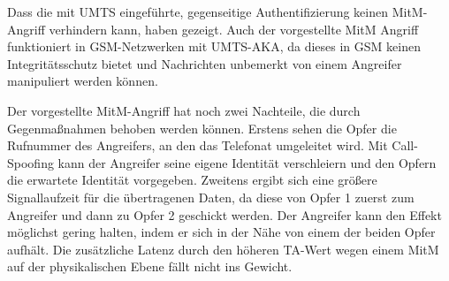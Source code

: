 Dass die mit \ac{UMTS} eingeführte, gegenseitige Authentifizierung keinen \ac{MitM}-Angriff verhindern kann, haben \citet{meyer2004man} gezeigt. Auch der vorgestellte \ac{MitM} Angriff funktioniert in \ac{GSM}-Netzwerken mit \ac{UMTS}-\ac{AKA}, da dieses in \ac{GSM} keinen Integritätsschutz bietet und Nachrichten unbemerkt von einem Angreifer manipuliert werden können.

Der vorgestellte \ac{MitM}-Angriff hat noch zwei Nachteile, die durch Gegenmaßnahmen behoben werden können. Erstens sehen die Opfer die Rufnummer des Angreifers, an den das Telefonat umgeleitet wird. Mit Call-Spoofing kann der Angreifer seine eigene Identität verschleiern und den Opfern die erwartete Identität vorgegeben. Zweitens ergibt sich eine größere Signallaufzeit für die übertragenen Daten, da diese von Opfer 1 zuerst zum Angreifer und dann zu Opfer 2 geschickt werden. Der Angreifer kann den Effekt möglichst gering halten, indem er sich in der Nähe von einem der beiden Opfer aufhält. Die zusätzliche Latenz durch den höheren \ac{TA}-Wert wegen einem \ac{MitM} auf der physikalischen Ebene fällt nicht ins Gewicht.